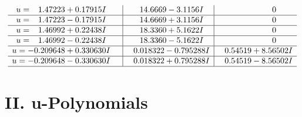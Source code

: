 \documentclass[1p]{elsarticle_modified}
\theoremstyle{definition}
\begin{document}
$$\begin{array}{c|c|c}
\begin{aligned}
u &= \phantom{-}1.47223 + 0.17915 I\end{aligned}
 & \phantom{-}14.6669 - 3.1156 I & \phantom{-0.000000 } 0 \\ \hline\begin{aligned}
u &= \phantom{-}1.47223 - 0.17915 I\end{aligned}
 & \phantom{-}14.6669 + 3.1156 I & \phantom{-0.000000 } 0 \\ \hline\begin{aligned}
u &= \phantom{-}1.46992 + 0.22438 I\end{aligned}
 & \phantom{-}18.3360 + 5.1622 I & \phantom{-0.000000 } 0 \\ \hline\begin{aligned}
u &= \phantom{-}1.46992 - 0.22438 I\end{aligned}
 & \phantom{-}18.3360 - 5.1622 I & \phantom{-0.000000 } 0 \\ \hline\begin{aligned}
u &= -0.209648 + 0.330630 I\end{aligned}
 & \phantom{-}0.018322 - 0.795288 I & \phantom{-}0.54519 + 8.56502 I \\ \hline\begin{aligned}
u &= -0.209648 - 0.330630 I\end{aligned}
 & \phantom{-}0.018322 + 0.795288 I & \phantom{-}0.54519 - 8.56502 I\\
 \hline 
 \end{array}$$\newpage
\newpage\renewcommand{\arraystretch}{1}
\centering \section*{ II. u-Polynomials}
\end{document}
